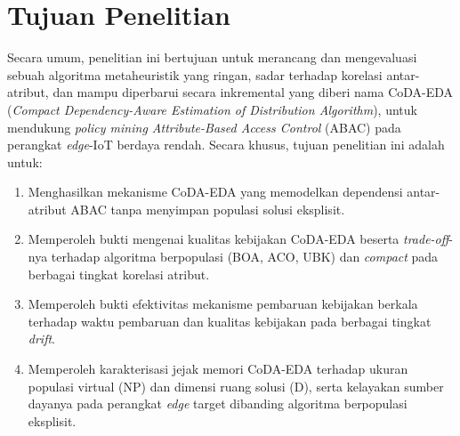\section{Tujuan Penelitian}

Secara umum, penelitian ini bertujuan untuk merancang dan mengevaluasi sebuah algoritma metaheuristik yang ringan, sadar terhadap korelasi antar-atribut, dan mampu diperbarui secara inkremental yang diberi nama CoDA-EDA\label{first:coda-eda} (\textit{Compact Dependency-Aware Estimation of Distribution Algorithm}), untuk mendukung \textit{policy mining Attribute-Based Access Control} (ABAC) pada perangkat \textit{edge}-IoT berdaya rendah.
Secara khusus, tujuan penelitian ini adalah untuk:
\begin{enumerate}
    \item Menghasilkan mekanisme CoDA-EDA yang memodelkan dependensi antar-atribut ABAC tanpa menyimpan populasi solusi eksplisit.
    \item Memperoleh bukti mengenai kualitas kebijakan CoDA-EDA beserta \textit{trade-off}-nya terhadap algoritma berpopulasi (BOA, ACO, UBK) dan \textit{compact} pada berbagai tingkat korelasi atribut.
    \item Memperoleh bukti efektivitas mekanisme pembaruan kebijakan berkala terhadap waktu pembaruan dan kualitas kebijakan pada berbagai tingkat \textit{drift}.
    \item Memperoleh karakterisasi jejak memori CoDA-EDA terhadap ukuran populasi virtual (NP)\label{first:symbol-np} dan dimensi ruang solusi (D)\label{first:symbol-d}, serta kelayakan sumber dayanya pada perangkat \textit{edge} target dibanding algoritma berpopulasi eksplisit.
\end{enumerate}
